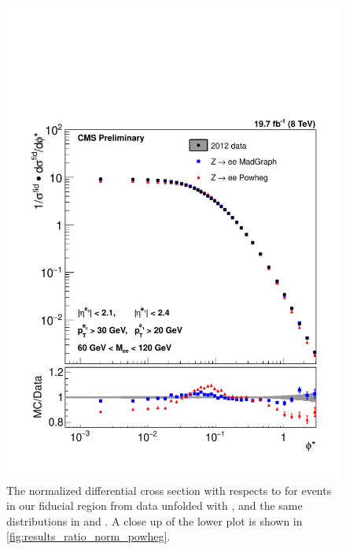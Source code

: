 \begin{figure}[!p]
    \centering
    \includegraphics[width=\textwidth]{figures/ZShape_elec_PH_Norm_Dressed.pdf}
    \caption[
        The normalized differential cross section with respects to \phistar for
        \Ztoee events in our fiducial region from data unfolded with \POWHEG,
        and the same distributions in \MADGRAPH and \POWHEG.
    ]{
        The normalized differential cross section with respects to \phistar for
        \Ztoee events in our fiducial region from data unfolded with \POWHEG,
        and the same distributions in \MADGRAPH and \POWHEG. A close up of the
        lower plot is shown in \cref{fig:results_ratio_norm_powheg}.
    }
    \label{fig:results_norm_powheg}
\end{figure}


